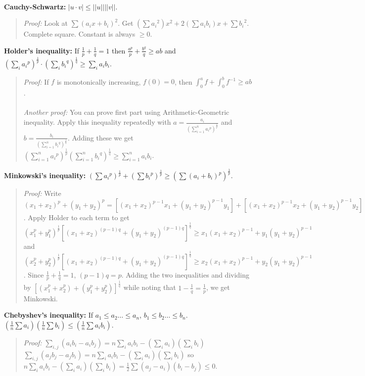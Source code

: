 \\
{\bf Cauchy-Schwartz:} $|u \cdot v|  \leq ||u|| ||v||$.
\begin{quote}
\emph{Proof:} Look at
$\sum (a_i x + b_i )^2$.  Get $(\sum {a_i}^2)x^2 + 2 (\sum a_i b_i) x +
\sum {b_i}^2$.  Complete square. Constant is always $\geq 0$.
\end{quote}
{\bf Holder's inequality:}
If ${\frac {1} {p}} + {\frac {1} {q}} = 1$ then
${\frac {a^p} {p}} + {\frac {b^q} {q}} \geq ab$ and
$(\sum_{i} {a_i}^p )^{\frac 1 p} \cdot (\sum_{i} {b_i}^q )^{\frac 1 q}  \geq
\sum_{i} a_i b_i $.
\begin{quote}
\emph{Proof:} If $f$ is
monotonically increasing, $f(0)= 0$, then $\int_0^a f + \int_0^b f^{-1} \geq
ab$.
\\
\\
\emph{Another proof:}  You can prove first part using Arithmetic-Geometric inequality.
Apply this inequality repeatedly with
$a= {\frac {a_{i}} {(\sum_{i=1}^n {a_i}^p)^{\frac 1 p}}}$ and
$b= {\frac {b_{i}} {(\sum_{i=1}^n {b_i}^q)^{\frac 1 q}}}$.  Adding these we get
$(\sum_{i=1}^n {{a_i}^p})^{\frac 1 p}
(\sum_{i=1}^n {{b_i}^q})^{\frac 1 q} \geq
\sum_{i=1}^n a_i b_i$.
\end{quote}
{\bf Minkowski's inequality:}
$(\sum {a_i}^p )^{\frac 1 p} +
(\sum {b_i}^p )^{\frac 1 p} \geq (\sum (a_i + b_i )^p )^{\frac 1 p}$.
\begin{quote}
\emph{Proof:}  Write
$(x_1+x_2)^p +(y_1+y_2)^p
= [(x_1+x_2)^{p-1}x_1 +(y_1+y_2)^{p-1} y_1]
+ [(x_1+x_2)^{p-1}x_2 +(y_1+y_2)^{p-1} y_2]$.  Apply Holder to each term to
get
$(x_1^p+y_1^p)^{\frac 1 p}
[(x_1+x_2)^{(p-1)q}
+(y_1+y_2)^{(p-1)q}]^{\frac 1 q} \geq
x_1(x_1+x_2)^{p-1} +
y_1(y_1+y_2)^{p-1}$ and
$(x_2^p+y_2^p)^{\frac 1 p}
[(x_1+x_2)^{(p-1)q}
+(y_1+y_2)^{(p-1)q}]^{\frac 1 q} \geq
x_2(x_1+x_2)^{p-1} +
y_2(y_1+y_2)^{p-1}$.  Since ${\frac 1 p} + {\frac 1 q} = 1$, $(p-1)q=p$.
Adding the two inequalities and dividing by
$[(x_1^p+x_2^p) + (y_1^p+y_2^p)]^{\frac 1 q}$ while noting that
$1 - {\frac 1 q} = {\frac 1 p}$, we get Minkowski.
\end{quote}
{\bf Chebyshev's inequality:}
If $a_1 \leq a_2 \ldots \le a_n$, $b_1 \leq b_2 \ldots \le b_n$.
$({\frac {1} {n}} \sum a_i )
({\frac {1} {n}} \sum b_i ) \leq
({\frac {1} {n}} \sum a_i b_i)$. 
\begin{quote}
\emph{Proof:}
$\sum_{i,j} (a_i b_i - a_i b_j )=
n \sum_i a_i b_i -(\sum_i a_i ) (\sum_i b_i )$
$\sum_{i,j} (a_j b_j - a_j b_i )=
n \sum_i a_i b_i -(\sum_i a_i ) (\sum_i b_i )$
so
$n \sum_i a_i b_i -(\sum_i a_i ) (\sum_i b_i )= {\frac {1} {2}}
\sum (a_j - a_i) (b_i - b_j) \leq 0$.
\end{quote}
